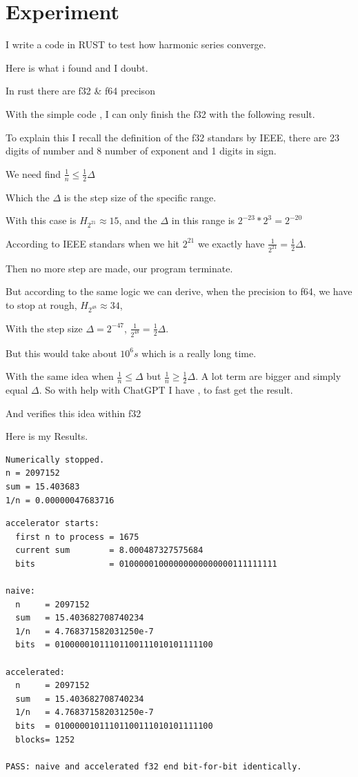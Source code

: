 



\section{Experiment}
I write a code in RUST to test how harmonic series
converge.

Here is what i found and I doubt.

In rust there are f32 \& f64 precison

With the simple code \cite[naive-method]{naive-method},
I can only finish the f32 with the following result.

To explain this I recall the definition of the f32
standars by IEEE, there are 23 digits of number and
8 number of exponent and 1 digits in sign.

We need find \(\frac{1}{n}\le \frac{1}{2}\Delta\)

Which the \(\Delta\) is the step size of the specific
range.

With this case is \(H_{2^{21}}\approx 15\),
and the \(\Delta\) in this range is \(2^{-23}*2^{3}=2^{-20}\)

According to IEEE standars when we hit \(2^{21}\)
we exactly have \(\frac{1}{2^{21}}=\frac{1}{2}\Delta\).

Then no more step are made, our program terminate.

But according to the same logic we can derive,
when the precision to f64, we have to stop at rough,
\(H_{2^{48}}\approx 34\),

With the step size \(\Delta=2^{-47}\),
\(\frac{1}{2^{48}}=\frac{1}{2}\Delta\).

But this would take about \(10^{6}s\) which is a really
long time.

With the same idea when \(\frac{1}{n}\le \Delta\) but
\(\frac{1}{n}\ge \frac{1}{2}\Delta\).
A lot term are bigger and simply equal \(\Delta\).
So with help with ChatGPT
I have \cite[accelerated]{accelerated}, to fast get the
result.

And verifies this idea within f32 \cite[verifyf32]{verifyf32}

Here is my Results.
\begin{lstlisting}
Numerically stopped.
n = 2097152
sum = 15.403683
1/n = 0.00000047683716
\end{lstlisting}

\begin{lstlisting}
accelerator starts:
  first n to process = 1675
  current sum        = 8.000487327575684
  bits               = 01000001000000000000000111111111

naive:
  n     = 2097152
  sum   = 15.403682708740234
  1/n   = 4.768371582031250e-7
  bits  = 01000001011101100111010101111100

accelerated:
  n     = 2097152
  sum   = 15.403682708740234
  1/n   = 4.768371582031250e-7
  bits  = 01000001011101100111010101111100
  blocks= 1252

PASS: naive and accelerated f32 end bit-for-bit identically.
\end{lstlisting}

